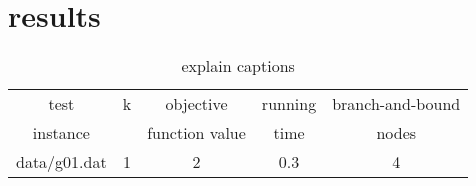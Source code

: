 \section{results}


\begin{table} 
\small
\centering
\begin{tabular}{ccccc}
\hline
test &    k & objective & running  & branch-and-bound \\
instance &  & function value & time & nodes \\
\hline
data/g01.dat 	& 1 & 2 & 0.3 & 4 \\

\hline
\end{tabular}
\caption{explain captions}
\label{tbl:scf}
\end{table}
